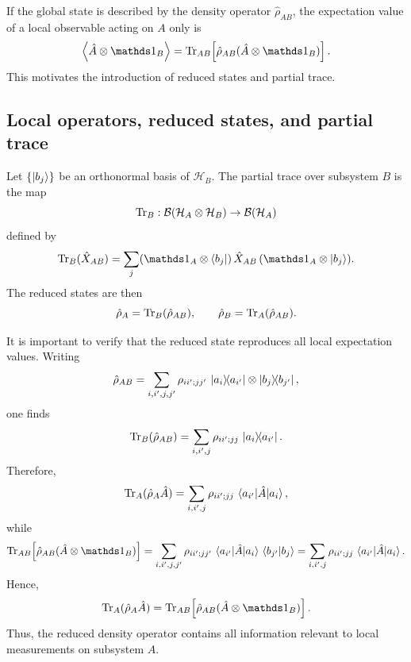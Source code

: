 If the global state is described by the density operator $\hat \rho_{AB}$, the expectation value of a local observable acting on $A$ only is
\begin{equation}
	\expval{\hat A\otimes \id_B}
	=
	\Tr_{AB}\!\left[\hat \rho_{AB}(\hat A\otimes \id_B)\right].
	\label{eq:intro_qm_local_expectation_global_state}
\end{equation}
This motivates the introduction of reduced states and partial trace.

\subsection{Local operators, reduced states, and partial trace}

Let $\{\ket{b_j}\}$ be an orthonormal basis of $\mathcal{H}_B$. The partial trace over subsystem $B$ is the map
\begin{equation}
	\Tr_B:\mathcal{B}(\mathcal{H}_A\otimes\mathcal{H}_B)\to\mathcal{B}(\mathcal{H}_A)
	\label{eq:intro_qm_partial_trace_map}
\end{equation}
defined by
\begin{equation}
	\Tr_B(\hat X_{AB})
	=
	\sum_j (\id_A\otimes\bra{b_j})\,\hat X_{AB}\,(\id_A\otimes\ket{b_j}).
	\label{eq:intro_qm_partial_trace_definition}
\end{equation}
The reduced states are then
\begin{equation}
	\hat \rho_A=\Tr_B(\hat \rho_{AB}),
	\qquad
	\hat \rho_B=\Tr_A(\hat \rho_{AB}).
	\label{eq:intro_qm_reduced_density_operator_AB}
\end{equation}

It is important to verify that the reduced state reproduces all local expectation values. Writing
\begin{equation}
	\hat \rho_{AB}
	=
	\sum_{i,i',j,j'} \rho_{ii';jj'}\,
	\dyad{a_i}{a_{i'}}\otimes\dyad{b_j}{b_{j'}},
	\label{eq:intro_qm_global_state_product_basis_expansion}
\end{equation}
one finds
\begin{equation}
	\Tr_B(\hat \rho_{AB})
	=
	\sum_{i,i',j} \rho_{ii';jj}\,\dyad{a_i}{a_{i'}}.
	\label{eq:intro_qm_partial_trace_expansion}
\end{equation}
Therefore,
\begin{equation}
	\Tr_A(\hat \rho_A \hat A)
	=
	\sum_{i,i',j} \rho_{ii';jj}\,\matrixel{a_{i'}}{\hat A}{a_i},
	\label{eq:intro_qm_local_expectation_reduced_state_step1}
\end{equation}
while
\begin{equation}
	\Tr_{AB}\!\left[\hat \rho_{AB}(\hat A\otimes \id_B)\right]
	=
	\sum_{i,i',j,j'}\rho_{ii';jj'}\,
	\matrixel{a_{i'}}{\hat A}{a_i}\,
	\braket{b_{j'}}{b_j}
	=
	\sum_{i,i',j}\rho_{ii';jj}\,\matrixel{a_{i'}}{\hat A}{a_i}.
	\label{eq:intro_qm_local_expectation_reduced_state_step2}
\end{equation}
Hence,
\begin{equation}
	\Tr_A(\hat \rho_A \hat A)
	=
	\Tr_{AB}\!\left[\hat \rho_{AB}(\hat A\otimes \id_B)\right].
	\label{eq:intro_qm_local_expectation_reduced_state}
\end{equation}
Thus, the reduced density operator contains all information relevant to local measurements on subsystem $A$.

